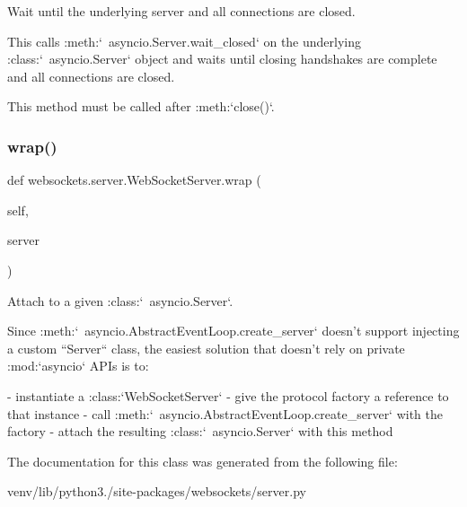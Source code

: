 \begin{DoxyVerb}Wait until the underlying server and all connections are closed.

This calls :meth:`~asyncio.Server.wait_closed` on the underlying
:class:`~asyncio.Server` object and waits until closing handshakes
are complete and all connections are closed.

This method must be called after :meth:`close()`.\end{DoxyVerb}
 \mbox{\label{classwebsockets_1_1server_1_1_web_socket_server_a60597fd69a0934641d155224dabbbbb6}} 
\subsubsection{\texorpdfstring{wrap()}{wrap()}}
{\footnotesize\ttfamily def websockets.\+server.\+Web\+Socket\+Server.\+wrap (\begin{DoxyParamCaption}\item[{}]{self,  }\item[{}]{server }\end{DoxyParamCaption})}

\begin{DoxyVerb}Attach to a given :class:`~asyncio.Server`.

Since :meth:`~asyncio.AbstractEventLoop.create_server` doesn't support
injecting a custom ``Server`` class, the easiest solution that doesn't
rely on private :mod:`asyncio` APIs is to:

- instantiate a :class:`WebSocketServer`
- give the protocol factory a reference to that instance
- call :meth:`~asyncio.AbstractEventLoop.create_server` with the
  factory
- attach the resulting :class:`~asyncio.Server` with this method\end{DoxyVerb}
 

The documentation for this class was generated from the following file\+:\begin{DoxyCompactItemize}
\item 
venv/lib/python3./site-\/packages/websockets/server.\+py\end{DoxyCompactItemize}

